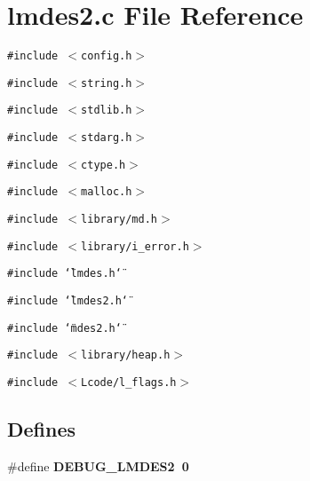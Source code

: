 \section{lmdes2.c File Reference}
\label{lmdes2_8c}
{\tt \#include $<$config.h$>$}\par
{\tt \#include $<$string.h$>$}\par
{\tt \#include $<$stdlib.h$>$}\par
{\tt \#include $<$stdarg.h$>$}\par
{\tt \#include $<$ctype.h$>$}\par
{\tt \#include $<$malloc.h$>$}\par
{\tt \#include $<$library/md.h$>$}\par
{\tt \#include $<$library/i\_\-error.h$>$}\par
{\tt \#include \char`\"{}lmdes.h\char`\"{}}\par
{\tt \#include \char`\"{}lmdes2.h\char`\"{}}\par
{\tt \#include \char`\"{}mdes2.h\char`\"{}}\par
{\tt \#include $<$library/heap.h$>$}\par
{\tt \#include $<$Lcode/l\_\-flags.h$>$}\par
\subsection*{Defines}
\begin{CompactItemize}
\item 
\#define \bf{DEBUG\_\-LMDES2}~0
\end{CompactItemize}
